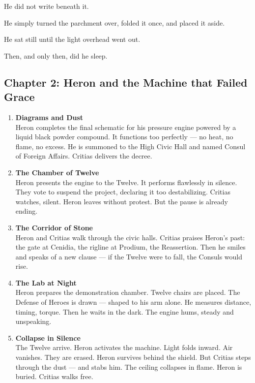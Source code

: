 \documentclass[9pt]{article}
\begin{document}
He did not write beneath it.

He simply turned the parchment over, folded it once, and placed it aside.

He sat still until the light overhead went out.

Then, and only then, did he sleep.

\newpage

\subsection*{Chapter 2: Heron and the Machine that Failed Grace}

\vspace{1in}

\begin{center}
\begin{enumerate}
    \item \textbf{Diagrams and Dust} \\
    Heron completes the final schematic for his pressure engine powered by a liquid black powder compound. It functions too perfectly — no heat, no flame, no excess. He is summoned to the High Civic Hall and named Consul of Foreign Affairs. Critias delivers the decree.

    \vspace{.3in}
    \item \textbf{The Chamber of Twelve} \\
    Heron presents the engine to the Twelve. It performs flawlessly in silence. They vote to suspend the project, declaring it too destabilizing. Critias watches, silent. Heron leaves without protest. But the pause is already ending.

    \vspace{.3in}
    \item \textbf{The Corridor of Stone} \\
    Heron and Critias walk through the civic halls. Critias praises Heron’s past: the gate at Cenidia, the rigline at Prodium, the Reassertion. Then he smiles and speaks of a new clause — if the Twelve were to fall, the Consuls would rise.

    \vspace{.3in}
    \item \textbf{The Lab at Night} \\
    Heron prepares the demonstration chamber. Twelve chairs are placed. The Defense of Heroes is drawn — shaped to his arm alone. He measures distance, timing, torque. Then he waits in the dark. The engine hums, steady and unspeaking.

    \vspace{.3in}
    \item \textbf{Collapse in Silence} \\
    The Twelve arrive. Heron activates the machine. Light folds inward. Air vanishes. They are erased. Heron survives behind the shield. But Critias steps through the dust — and stabs him. The ceiling collapses in flame. Heron is buried. Critias walks free.
\end{enumerate}
\end{center}
\end{document}
